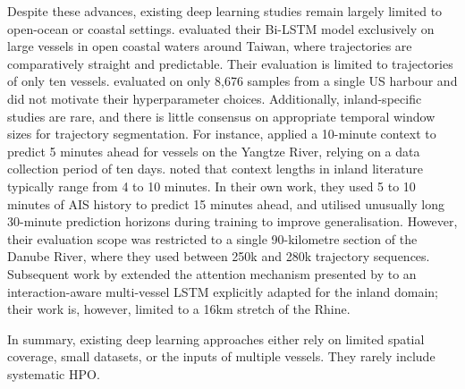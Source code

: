Despite these advances, existing deep learning studies remain largely limited to open-ocean or coastal settings.
\textcite{articlebilstmsus} evaluated their \ac{Bi-LSTM} model exclusively on large vessels in open coastal waters around Taiwan, where trajectories are comparatively straight and predictable.
Their evaluation is limited to trajectories of only ten vessels.
\textcite{sekhon2020} evaluated on only 8,676 samples from a single US harbour and did not motivate their hyperparameter choices. 
Additionally, inland-specific studies are rare, and there is little consensus on appropriate temporal window sizes for trajectory segmentation. For instance, \textcite{you2020stseq2seq} applied a 10-minute context to predict 5 minutes ahead for vessels on the Yangtze River, relying on a data collection period of ten days. \textcite{donandt2022shortterm} noted that context lengths in inland literature typically range from 4 to 10 minutes. In their own work, they used 5 to 10 minutes of \ac{AIS} history to predict 15 minutes ahead, and utilised unusually long 30-minute prediction horizons during training to improve generalisation. However, their evaluation scope was restricted to a single 90-kilometre section of the Danube River, where they used between 250k and 280k trajectory sequences. 
Subsequent work by \textcite{legel2025} extended the attention mechanism presented by \textcite{sekhon2020} to an interaction-aware multi-vessel \ac{LSTM} explicitly adapted for the inland domain; their work is, however, limited to a 16km stretch of the Rhine. %

In summary, existing deep learning approaches either rely on limited spatial coverage, small data\-sets, or the inputs of multiple vessels. They rarely include sys\-tem\-at\-ic \ac{HPO}. %



